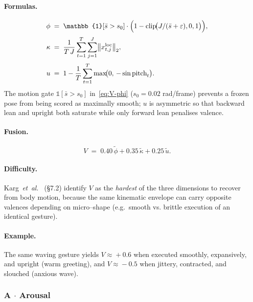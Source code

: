 \paragraph{Formulas.}
\begin{align}
  \phi   &\;=\; \mathbb{1}[\bar s>s_0]\cdot
          \Bigl(1 - \operatorname{clip}\!\bigl(J/(\bar s+\varepsilon),0,1\bigr)\Bigr),
          \label{eq:V-phi}\\[2pt]
  \kappa &\;=\; \frac{1}{T\,J}\sum_{t=1}^{T}\sum_{j=1}^{J}\bigl\|x^{\text{loc}}_{t,j}\bigr\|_2,
          \label{eq:V-kappa}\\[2pt]
  u      &\;=\; 1 - \frac{1}{T}\sum_{t=1}^{T}\max\!\bigl(0,\,-\sin\text{pitch}_t\bigr).
          \label{eq:V-u}
\end{align}
The motion gate $\mathbb{1}[\bar s>s_0]$ in~\eqref{eq:V-phi} ($s_0=0.02$
rad/frame) prevents a frozen pose from being scored as maximally smooth;
$u$ is asymmetric so that backward lean and upright both saturate while
only forward lean penalises valence.

\paragraph{Fusion.}
\begin{equation}
  V \;=\; 0.40\,\tilde\phi + 0.35\,\tilde\kappa + 0.25\,\tilde u.
  \label{eq:V-fuse}
\end{equation}

\paragraph{Difficulty.}
Karg~\textit{et~al.}~\cite{karg2013body} (\S7.2) identify $V$ as the
\emph{hardest} of the three dimensions to recover from body motion,
because the same kinematic envelope can carry opposite valences depending
on micro--shape (e.g.\ smooth vs. brittle execution of an identical
gesture).

\paragraph{Example.}
The same waving gesture yields $V\!\approx\!+0.6$ when executed smoothly,
expansively, and upright (warm greeting), and $V\!\approx\!-0.5$ when
jittery, contracted, and slouched (anxious wave).

\subsubsection*{A $\cdot$ Arousal}

